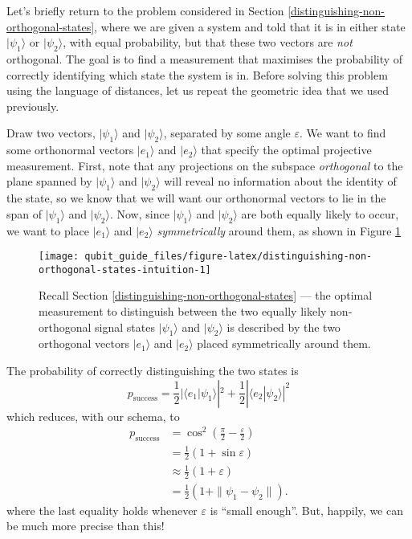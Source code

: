 \documentclass[fleqn]{article}
\begin{document}
Let's briefly return to the problem considered in Section \ref{distinguishing-non-orthogonal-states}, where we are given a system and told that it is in either state \(|\psi_1\rangle\) or \(|\psi_2\rangle\), with equal probability, but that these two vectors are \emph{not} orthogonal.
The goal is to find a measurement that maximises the probability of correctly identifying which state the system is in.
Before solving this problem using the language of distances, let us repeat the geometric idea that we used previously.

Draw two vectors, \(|\psi_1\rangle\) and \(|\psi_2\rangle\), separated by some angle \(\varepsilon\).
We want to find some orthonormal vectors \(|e_1\rangle\) and \(|e_2\rangle\) that specify the optimal projective measurement.
First, note that any projections on the subspace \emph{orthogonal} to the plane spanned by \(|\psi_1\rangle\) and \(|\psi_2\rangle\) will reveal no information about the identity of the state, so we know that we will want our orthonormal vectors to lie in the span of \(|\psi_1\rangle\) and \(|\psi_2\rangle\).
Now, since \(|\psi_1\rangle\) and \(|\psi_2\rangle\) are both equally likely to occur, we want to place \(|e_1\rangle\) and \(|e_2\rangle\) \emph{symmetrically} around them, as shown in Figure \ref{fig:distinguishing-non-orthogonal-states-intuition}



\begin{figure}[H]

{\centering \texttt{[image: qubit\_guide\_files/figure-latex/distinguishing-non-orthogonal-states-intuition-1]} 

}

\caption{Recall Section \ref{distinguishing-non-orthogonal-states} --- the optimal measurement to distinguish between the two equally likely non-orthogonal signal states \(|\psi_1\rangle\) and \(|\psi_2\rangle\) is described by the two orthogonal vectors \(|e_1\rangle\) and \(|e_2\rangle\) placed symmetrically around them.}\label{fig:distinguishing-non-orthogonal-states-intuition}
\end{figure}

The probability of correctly distinguishing the two states is
\[
  p_{\mathrm{success}}
  = \frac{1}{2}|\langle e_1|\psi_1\rangle|^2 + \frac{1}{2}|\langle e_2|\psi_2\rangle|^2
\]
which reduces, with our schema, to
\[
  \begin{aligned}
    p_{\mathrm{success}}
    &= \cos^2\left(\frac{\pi}{2}-\frac{\varepsilon}{2}\right)
  \\&= \frac{1}{2}(1+\sin\varepsilon)
  \\&\approx \frac{1}{2}(1+\varepsilon)
  \\&= \frac{1}{2}(1+\|\psi_1-\psi_2\|).
  \end{aligned}
\]
where the last equality holds whenever \(\varepsilon\) is ``small enough''.
But, happily, we can be much more precise than this!
\end{document}
